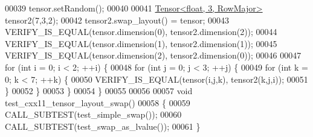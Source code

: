\begin{DoxyCode}
00039   tensor.setRandom();
00040 
00041   \hyperlink{class_eigen_1_1_tensor}{Tensor<float, 3, RowMajor>} tensor2(7,3,2);
00042   tensor2.swap\_layout() = tensor;
00043   VERIFY\_IS\_EQUAL(tensor.dimension(0), tensor2.dimension(2));
00044   VERIFY\_IS\_EQUAL(tensor.dimension(1), tensor2.dimension(1));
00045   VERIFY\_IS\_EQUAL(tensor.dimension(2), tensor2.dimension(0));
00046 
00047   \textcolor{keywordflow}{for} (\textcolor{keywordtype}{int} i = 0; i < 2; ++i) \{
00048     \textcolor{keywordflow}{for} (\textcolor{keywordtype}{int} j = 0; j < 3; ++j) \{
00049       \textcolor{keywordflow}{for} (\textcolor{keywordtype}{int} k = 0; k < 7; ++k) \{
00050         VERIFY\_IS\_EQUAL(tensor(i,j,k), tensor2(k,j,i));
00051       \}
00052     \}
00053   \}
00054 \}
00055 
00056 
00057 \textcolor{keywordtype}{void} test\_cxx11\_tensor\_layout\_swap()
00058 \{
00059   CALL\_SUBTEST(test\_simple\_swap());
00060   CALL\_SUBTEST(test\_swap\_as\_lvalue());
00061 \}
\end{DoxyCode}
